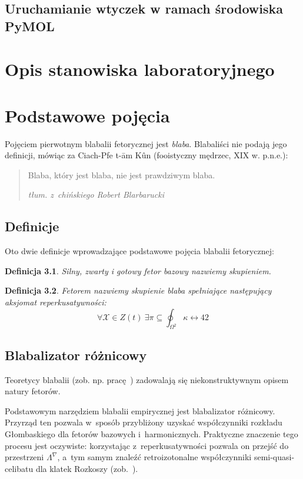 \documentclass[licencjacka]{pracamgr}
\newtheorem{defi}{Definicja}[section]
\begin{document}
\section{Uruchamianie wtyczek w ramach środowiska PyMOL}

\chapter{Opis stanowiska laboratoryjnego}


\iffalse
\chapter{Podstawowe pojęcia}\label{r:pojecia}

Pojęciem pierwotnym blabalii fetorycznej jest \emph{blaba}.
Blabaliści nie podają jego definicji, mówiąc za Ciach-Pfe t-\=am
K\^un (fooistyczny mędrzec, XIX w. p.n.e.):
\begin{quote}
  Blaba, który jest blaba, nie jest prawdziwym blaba.

\raggedleft\slshape tłum. z~chińskiego Robert Blarbarucki
\end{quote}

\section{Definicje}

Oto dwie definicje wprowadzające podstawowe pojęcia blabalii
fetorycznej:

\begin{defi}\label{skupienie}
  Silny, zwarty i gotowy fetor bazowy nazwiemy \emph{skupieniem}.
\end{defi}

\begin{defi}\label{fetor}
  \emph{Fetorem} nazwiemy skupienie blaba spełniające następujący
  \emph{aksjomat reperkusatywności}:
  $$\forall \mathcal{X}\in Z(t)\ \exists
  \pi\subseteq\oint_{\Omega^2}\kappa\leftrightarrow 42$$
\end{defi}


\section{Blabalizator różnicowy}

Teoretycy blabalii (zob. np. pracę~\cite{grglo}) zadowalają się
niekonstruktywnym opisem natury fetorów.

Podstawowym narzędziem blabalii empirycznej jest blabalizator
różnicowy.  Przyrząd ten pozwala w~sposób przybliżony uzyskać
współczynniki rozkładu Głombaskiego dla fetorów bazowych
i~harmonicznych.  Praktyczne znaczenie tego procesu jest oczywiste:
korzystając z~reperkusatywności pozwala on przejść do przestrzeni
$\Lambda^{\nabla}$, a~tym samym znaleźć retroizotonalne współczynniki
semi-quasi-celibatu dla klatek Rozkoszy (zob.~\cite{JR}).
\end{document}

